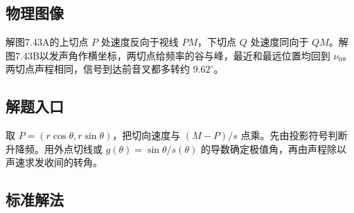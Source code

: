 \documentclass[UTF8,fontset=fandol,a4paper,11pt]{ctexart}
\begin{document}


\subsection*{物理图像}

解图7.43A的上切点 $P$ 处速度反向于视线 $PM$，下切点 $Q$ 处速度同向于 $QM$。解图7.43B以发声角作横坐标，两切点给频率的谷与峰，最近和最远位置均回到 $\nu_0$。两切点声程相同，信号到达前音叉都多转约 $9.62^\circ$。




\subsection*{解题入口}

取 $P=(r\cos\theta,r\sin\theta)$，把切向速度与 $(M-P)/s$ 点乘。先由投影符号判断升降频。用外点切线或 $g(\theta)=\sin\theta/s(\theta)$ 的导数确定极值角，再由声程除以声速求发收间的转角。



\subsection*{标准解法}
\end{document}
